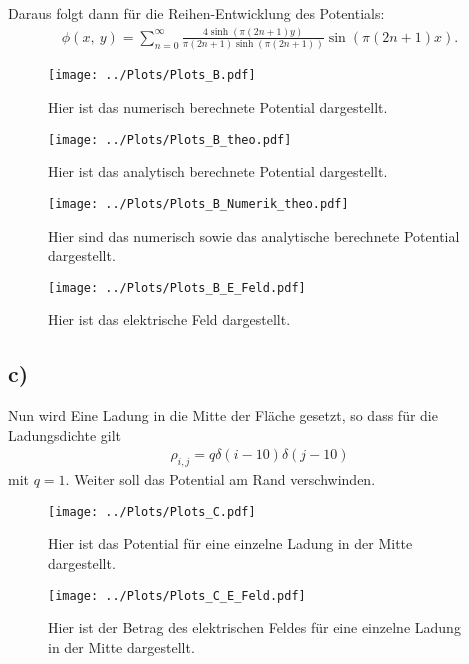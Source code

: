 Daraus folgt dann für die Reihen-Entwicklung des Potentials:
\begin{align}
	\phi(x,\ y)=\sum\limits_{n=0}^{\infty}\frac{4\sinh(\pi (2n+1)y)}{\pi(2n+1)\sinh(\pi(2n+1))}\sin(\pi(2n+1)x).
\end{align} 
\begin{figure}[h!]
	\centering
	\texttt{[image: ../Plots/Plots\_B.pdf]}
	\caption{Hier ist das numerisch berechnete Potential dargestellt.}
\end{figure}
\begin{figure}[h!]
	\centering
	\texttt{[image: ../Plots/Plots\_B\_theo.pdf]}
	\caption{Hier ist das analytisch berechnete Potential dargestellt.}
\end{figure}
\begin{figure}[h!]
	\centering
	\texttt{[image: ../Plots/Plots\_B\_Numerik\_theo.pdf]}
	\caption{Hier sind das numerisch sowie das analytische berechnete Potential dargestellt.}
\end{figure}
\begin{figure}[h!]
	\centering
	\texttt{[image: ../Plots/Plots\_B\_E\_Feld.pdf]}
	\caption{Hier ist das elektrische Feld dargestellt.}
\end{figure}
\newpage
\vspace*{5cm}
\newpage
\subsection*{c)}
Nun wird Eine Ladung in die Mitte der Fläche gesetzt, so dass für die Ladungsdichte gilt 
\begin{align}
	\rho_{i,j}=q\delta(i-10)\delta(j-10)
\end{align}
mit $q=1$.
Weiter soll das Potential am Rand verschwinden.
\begin{figure}[h!]
	\centering
	\texttt{[image: ../Plots/Plots\_C.pdf]}
	\caption{Hier ist das Potential für eine einzelne Ladung in der Mitte dargestellt.}
\end{figure}
\begin{figure}[h!]
	\centering
	\texttt{[image: ../Plots/Plots\_C\_E\_Feld.pdf]}
	\caption{Hier ist der Betrag des elektrischen Feldes für eine einzelne Ladung in der Mitte dargestellt.}
\end{figure}
